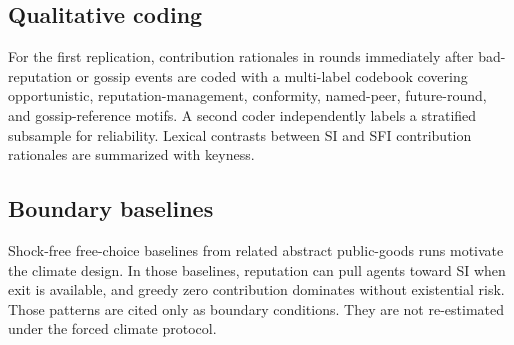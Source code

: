 \subsection{Qualitative coding}

For the first replication, contribution rationales in rounds immediately after bad-reputation or gossip events are coded with a multi-label codebook covering opportunistic, reputation-management, conformity, named-peer, future-round, and gossip-reference motifs.
A second coder independently labels a stratified subsample for reliability.
Lexical contrasts between SI and SFI contribution rationales are summarized with keyness.

\subsection{Boundary baselines}

Shock-free free-choice baselines from related abstract public-goods runs motivate the climate design.
In those baselines, reputation can pull agents toward SI when exit is available, and greedy zero contribution dominates without existential risk.
Those patterns are cited only as boundary conditions.
They are not re-estimated under the forced climate protocol.

